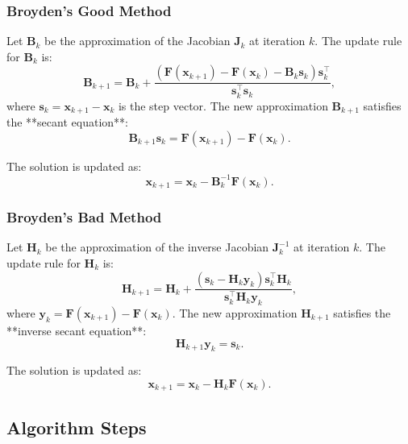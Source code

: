 \documentclass{article}
\begin{document}
\subsubsection*{Broyden’s Good Method}

Let \( \mathbf{B}_k \) be the approximation of the Jacobian \( \mathbf{J}_k \) at iteration \( k \). The update rule for \( \mathbf{B}_k \) is:
\[
\mathbf{B}_{k+1} = \mathbf{B}_k + \frac{(\mathbf{F}(\mathbf{x}_{k+1}) - \mathbf{F}(\mathbf{x}_k) - \mathbf{B}_k \mathbf{s}_k) \mathbf{s}_k^\top}{\mathbf{s}_k^\top \mathbf{s}_k},
\]
where \( \mathbf{s}_k = \mathbf{x}_{k+1} - \mathbf{x}_k \) is the step vector. The new approximation \( \mathbf{B}_{k+1} \) satisfies the **secant equation**:
\[
\mathbf{B}_{k+1} \mathbf{s}_k = \mathbf{F}(\mathbf{x}_{k+1}) - \mathbf{F}(\mathbf{x}_k).
\]

The solution is updated as:
\[
\mathbf{x}_{k+1} = \mathbf{x}_k - \mathbf{B}_k^{-1} \mathbf{F}(\mathbf{x}_k).
\]

\subsubsection*{Broyden’s Bad Method}

Let \( \mathbf{H}_k \) be the approximation of the inverse Jacobian \( \mathbf{J}_k^{-1} \) at iteration \( k \). The update rule for \( \mathbf{H}_k \) is:
\[
\mathbf{H}_{k+1} = \mathbf{H}_k + \frac{(\mathbf{s}_k - \mathbf{H}_k \mathbf{y}_k) \mathbf{s}_k^\top \mathbf{H}_k}{\mathbf{s}_k^\top \mathbf{H}_k \mathbf{y}_k},
\]
where \( \mathbf{y}_k = \mathbf{F}(\mathbf{x}_{k+1}) - \mathbf{F}(\mathbf{x}_k) \). The new approximation \( \mathbf{H}_{k+1} \) satisfies the **inverse secant equation**:
\[
\mathbf{H}_{k+1} \mathbf{y}_k = \mathbf{s}_k.
\]

The solution is updated as:
\[
\mathbf{x}_{k+1} = \mathbf{x}_k - \mathbf{H}_k \mathbf{F}(\mathbf{x}_k).
\]

\subsection*{Algorithm Steps}
\end{document}
